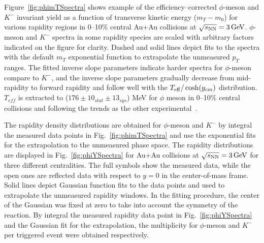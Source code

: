 \documentclass[%
 reprint,	
showpacs,
 amsmath,amssymb,
 aps,
 prc,
]{revtex4-1}
\begin{document}
Figure~\ref{fig:phimTSpectra} shows example of the efficiency--corrected $\phi$-meson and $K^-$ invariant yield as a function of transverse kinetic energy ($m_T-m_0$) for various rapidity regions in 0--10\% central Au+Au collisions at ${\sqrt{s_{\rm NN}} = \rm{3\,GeV}}$. $\phi$-meson and $K^-$ spectra in some rapidity species are scaled with arbitrary factors indicated on the figure for clarity. Dashed and solid lines depict fits to the spectra with the default $m_T$ exponential function to extrapolate the unmeasured $p_T$ ranges. The fitted inverse slope parameters indicate harder spectra for $\phi$-meson compare to $K^-$, and the inverse slope parameters gradually decrease from mid-rapidity to forward rapidity and follow well with the $T_{\rm eff}/\cosh(y_{cm})$ distribution. $T_{eff}$ is extracted to ($176\pm10_{stat}\pm13_{sys}$) MeV for $\phi$ meson in 0--10\% central collisions and following the trends as the other experimental~\cite{2018403,PhysRevC.80.025209,PhysRevC.78.044907}.


The rapidity density distributions are obtained for $\phi$-meson and $K^-$ by integral the measured data points in Fig.~\ref{fig:phimTSpectra} and use the exponential fits for the extrapolation to the unmeasured phase space. The rapidity distributions are displayed in Fig.~\ref{fig:phiYSpectra} for Au+Au collisions at ${\sqrt{s_{\rm NN}} = \rm{3\,GeV}}$ for three different centralities. The full symbols show the measured data, while the open ones are reflected data with respect to $y=0$ in the center-of-mass frame. Solid lines depict Gaussian function fits to the data points and used to extrapolate the unmeasured rapidity windows. In the fitting procedure, the center of the Gaussian was fixed at zero to take into account the symmetry of the reaction. By integral the measured rapidity data point in Fig.~\ref{fig:phiYSpectra} and the Gaussian fit for the extrapolation, the multiplicity for $\phi$-meson and $K^-$ per triggered event were obtained respectively.
\end{document}
